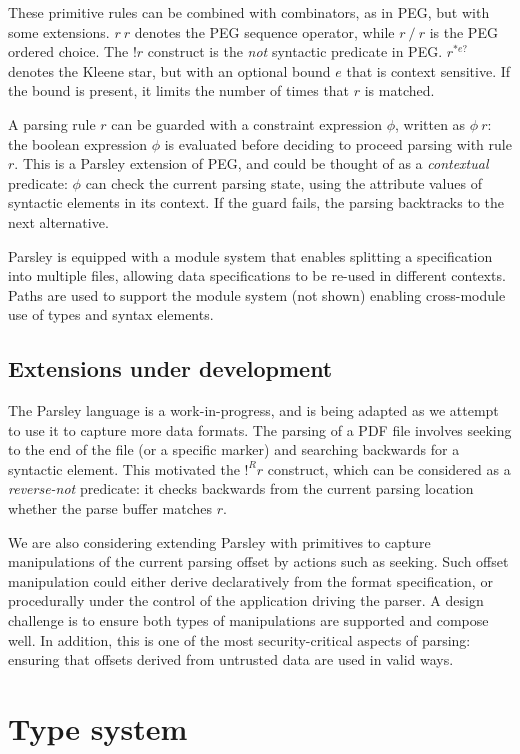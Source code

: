 \documentclass[letterpaper]{article}
\begin{document}
These primitive rules can be combined with combinators, as in PEG, but
with some extensions.  $r\ r$ denotes the PEG sequence operator, while
$r\ /\ r$ is the PEG ordered choice.  The $!r$ construct is the
\emph{not} syntactic predicate in PEG.  $r^{*e?}$ denotes the Kleene
star, but with an optional bound $e$ that is context sensitive.  If
the bound is present, it limits the number of times that $r$ is
matched.

A parsing rule $r$ can be guarded with a constraint expression $\phi$,
written as $\phi\ r$: the boolean expression $\phi$ is evaluated
before deciding to proceed parsing with rule $r$.  This is a Parsley
extension of PEG, and could be thought of as a \emph{contextual}
predicate: $\phi$ can check the current parsing state, using the
attribute values of syntactic elements in its context.  If the guard
fails, the parsing backtracks to the next alternative.

Parsley is equipped with a module system that enables splitting a
specification into multiple files, allowing data specifications to be
re-used in different contexts.  Paths are used to support the module
system (not shown) enabling cross-module use of types and syntax
elements.

\subsection*{Extensions under development}

The Parsley language is a work-in-progress, and is being adapted as we
attempt to use it to capture more data formats.  The parsing of a PDF
file involves seeking to the end of the file (or a specific marker)
and searching backwards for a syntactic element.  This motivated the
$!^Rr$ construct, which can be considered as a \emph{reverse-not}
predicate: it checks backwards from the current parsing location
whether the parse buffer matches $r$.

We are also considering extending Parsley with primitives to capture
manipulations of the current parsing offset by actions such as
seeking.  Such offset manipulation could either derive declaratively
from the format specification, or procedurally under the control of
the application driving the parser.  A design challenge is to ensure
both types of manipulations are supported and compose well.  In
addition, this is one of the most security-critical aspects of
parsing: ensuring that offsets derived from untrusted data are used in
valid ways.

\section{Type system}
\label{s:typesys}
\end{document}
